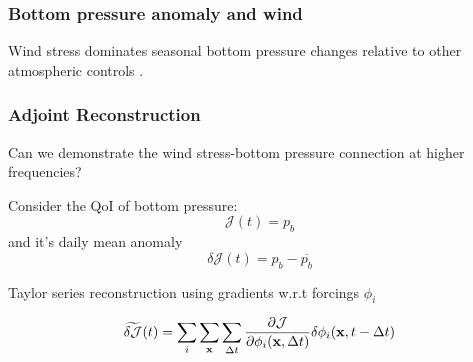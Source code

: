 \documentclass[10pt, aspectratio=169]{oden_beamer}
\begin{document}
\begin{frame} %
\frametitle{Bottom pressure anomaly and wind}
Wind stress dominates seasonal bottom pressure changes relative to other atmospheric controls \cite{Fukumori}\cite{chen_2023}.
\end{frame}
\begin{frame} %
\frametitle{Adjoint Reconstruction}

Can we demonstrate the wind stress-bottom pressure connection at higher frequencies?

\vspace{.5cm}

Consider the QoI of bottom pressure:
\begin{equation*}
    \mathcal{J}(t)=p_b
\end{equation*}
and it's daily mean anomaly 
\begin{equation*}
    \delta\mathcal{J}(t)=p_b - \overline{p_b}
\end{equation*}

Taylor series reconstruction using gradients w.r.t forcings $\phi_i$

\begin{equation*}
    \widetilde{\delta\mathcal{J}}(t)=\sum_i\sum_{\bf x}\sum_{\Delta t}\frac{\partial \mathcal{J}}{\partial\phi_i({\bf x}, \Delta t)}\delta\phi_i({\bf x},t-\Delta t)
\end{equation*}
\end{frame}
\end{document}
